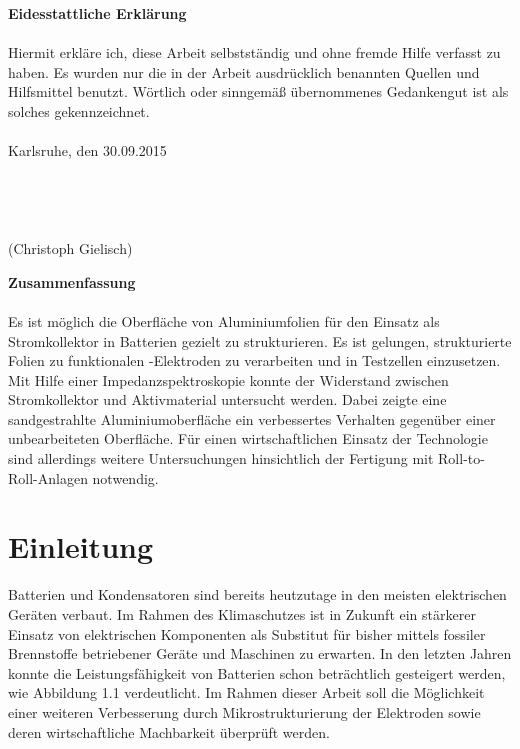 \documentclass[a4paper, 11pt, headsepline,footsepline,twoside,abstract]{scrbook}
\begin{document}
\cleardoubleemptypage
\setcounter{page}{1}
\textbf{\Large{Eidesstattliche Erklärung}}
\\\\
Hiermit erkläre ich, diese Arbeit selbstständig und ohne fremde Hilfe verfasst zu haben. Es wurden nur die in der Arbeit ausdrücklich benannten Quellen und Hilfsmittel benutzt. Wörtlich oder sinngemäß übernommenes Gedankengut ist als solches gekennzeichnet.
\\\\
Karlsruhe, den 30.09.2015
\\\\
\\\\
\\
(Christoph Gielisch) 
 
\newpage

\setcounter{page}{1}
\textbf{\Large{Zusammenfassung}}
\\\\
Es ist möglich die Oberfläche von Aluminiumfolien für den Einsatz als Stromkollektor in Batterien gezielt zu strukturieren. Es ist gelungen, strukturierte Folien zu funktionalen -Elektroden zu verarbeiten und in Testzellen einzusetzen. Mit Hilfe einer Impedanzspektroskopie konnte der Widerstand zwischen Stromkollektor und Aktivmaterial untersucht werden. Dabei zeigte eine sandgestrahlte Aluminiumoberfläche ein verbessertes Verhalten gegenüber einer unbearbeiteten Oberfläche. Für einen wirtschaftlichen Einsatz der Technologie sind allerdings weitere Untersuchungen hinsichtlich der Fertigung mit Roll-to-Roll-Anlagen notwendig.
\pagestyle{toc}
\renewcommand*{\chapterpagestyle}{toc} %
\tableofcontents
{} 
\newpage
\cleardoubleemptypage
\pagestyle{normal}
\renewcommand*{\chapterpagestyle}{plain}
\setcounter{page}{1}
\chapter{Einleitung}
Batterien und Kondensatoren sind bereits heutzutage in den meisten elektrischen Geräten verbaut. Im Rahmen des Klimaschutzes ist in Zukunft ein stärkerer Einsatz von elektrischen Komponenten als Substitut für bisher mittels fossiler Brennstoffe betriebener Geräte und Maschinen zu erwarten. In den letzten Jahren konnte die Leistungsfähigkeit von Batterien schon beträchtlich gesteigert werden, wie Abbildung 1.1 verdeutlicht. Im Rahmen dieser Arbeit soll die Möglichkeit einer weiteren Verbesserung durch Mikrostrukturierung der Elektroden sowie deren wirtschaftliche Machbarkeit überprüft werden.
\end{document}
